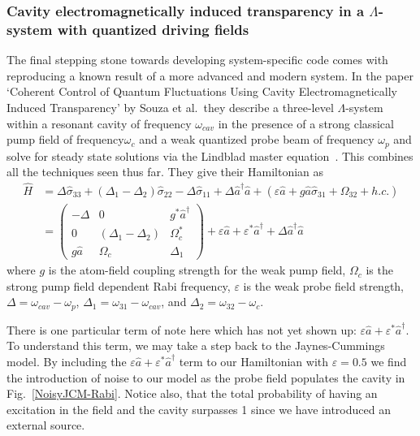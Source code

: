\documentclass[aps,pra,showpacs,amsmath,amssymb,nofootinbib,longbibliography,superscriptaddress
]{revtex4-1}
\theoremstyle{definition}
\theoremstyle{remark}
\newcommand{\0}{\hat{0}}
\begin{document}
\subsubsection{Cavity electromagnetically induced transparency in a $\Lambda$-system with quantized driving fields}

The final stepping stone towards developing system-specific code comes with reproducing a known result of a more advanced and modern system. In the paper `Coherent Control of Quantum Fluctuations Using Cavity Electromagnetically Induced Transparency' by Souza et al.~they describe a three-level $\Lambda$-system within a resonant cavity of frequency $\omega_{cav}$ in the presence of a strong classical pump field of frequency$\omega_c$ and a weak quantized probe beam of frequency $\omega_p$ and solve for steady state solutions via the Lindblad master equation~\cite{Souza}. This combines all the techniques seen thus far. They give their Hamiltonian as
\begin{align}
    \hat{H} &= \Delta \hat{\sigma}_{33} + (\Delta_1 - \Delta_2) \hat{\sigma}_{22} - \Delta \hat{\sigma}_{11} + \Delta \hat{a}^{\dagger} \hat{a} + \left( \varepsilon \hat{a} + g \hat{a} \hat{\sigma}_{31} + \Omega_{32} + h.c.\right) \nonumber \\
    &=
    \left(\begin{array}{ccc}
        -\Delta & 0 & g^* \hat{a}^{\dagger} \\
        0 & (\Delta_1 - \Delta_2) & \Omega_c^* \\
        g \hat{a} & \Omega_c & \Delta_1
    \end{array}\right) + \varepsilon \hat{a} + \varepsilon^{*} \hat{a}^{\dagger}  + \Delta \hat{a}^{\dagger} \hat{a}
\end{align}
where $g$ is the atom-field coupling strength for the weak pump field, $\Omega_c$ is the strong pump field dependent Rabi frequency, $\varepsilon$ is the weak probe field strength, $\Delta = \omega_{cav} - \omega_p$, $\Delta_1 = \omega_{31} - \omega_{cav}$, and $\Delta_2 = \omega_{32} - \omega_c$.

There is one particular term of note here which has not yet shown up: $\varepsilon \hat{a} + \varepsilon^{*} \hat{a}^{\dagger}$. To understand this term, we may take a step back to the Jaynes-Cummings model. By including the $\varepsilon \hat{a} + \varepsilon^{*} \hat{a}^{\dagger}$ term to our Hamiltonian with $\varepsilon = 0.5$ we find the introduction of noise to our model as the probe field populates the cavity in Fig.~\ref{NoisyJCM-Rabi}. Notice also, that the total probability of having an excitation in the field and the cavity surpasses 1 since we have introduced an external source.
\end{document}
